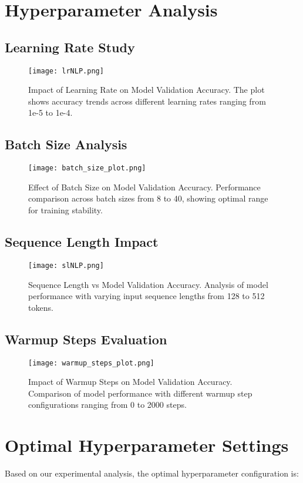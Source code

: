 \documentclass[12pt,a4paper]{report}
\begin{document}
\chapter{Hyperparameter Analysis}
\section{Learning Rate Study}
\begin{figure}[H]
\centering
\texttt{[image: lrNLP.png]}
\caption{Impact of Learning Rate on Model Validation Accuracy. The plot shows accuracy trends across different learning rates ranging from 1e-5 to 1e-4.}
\end{figure}

\section{Batch Size Analysis}
\begin{figure}[H]
\centering
\texttt{[image: batch\_size\_plot.png]}
\caption{Effect of Batch Size on Model Validation Accuracy. Performance comparison across batch sizes from 8 to 40, showing optimal range for training stability.}
\end{figure}

\section{Sequence Length Impact}
\begin{figure}[H]
\centering
\texttt{[image: slNLP.png]}
\caption{Sequence Length vs Model Validation Accuracy. Analysis of model performance with varying input sequence lengths from 128 to 512 tokens.}
\end{figure}

\section{Warmup Steps Evaluation}
\begin{figure}[H]
\centering
\texttt{[image: warmup\_steps\_plot.png]}
\caption{Impact of Warmup Steps on Model Validation Accuracy. Comparison of model performance with different warmup step configurations ranging from 0 to 2000 steps.}
\end{figure}

\chapter{Optimal Hyperparameter Settings}
Based on our experimental analysis, the optimal hyperparameter configuration is:
\end{document}

